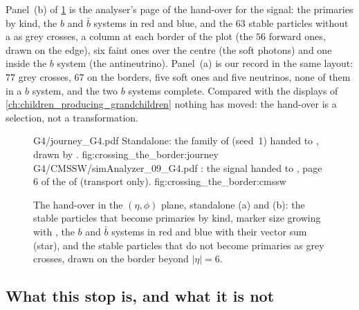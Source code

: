 Panel~(b) of \cref{fig:crossing_the_border:displays} is the analyser's page
of the hand-over for the signal: the primaries by kind, the $b$ and $\bar b$
systems in red and blue, and the $63$ stable particles without a
 as grey crosses, a column at each border of the plot (the
$56$ forward ones, drawn on the edge), six faint ones over the centre (the
soft photons) and one inside the $b$ system (the antineutrino). Panel~(a)
is our record in the same layout: $77$ grey crosses, $67$ on the borders,
five soft ones and five neutrinos, none of them in a $b$ system, and the two
$b$ systems complete. Compared with the displays of
\cref{ch:children_producing_grandchildren} nothing has moved: the hand-over is a selection,
not a transformation.

\begin{figure}[p]\centering
\ledgerdisplays
  {G4/journey_G4.pdf}
  {Standalone: the family of  (seed~1) handed to \GEANT, drawn by .}
  {fig:crossing_the_border:journey}
  {G4/CMSSW/simAnalyzer_09_G4.pdf}
  {\CMSSW: the signal handed to \GEANT, page 6 of the  of  (transport only).}
  {fig:crossing_the_border:cmssw}
\caption[The hand-over in the $(\eta,\phi)$ plane, standalone and
\CMSSW]{The hand-over in the $(\eta,\phi)$ plane, standalone (a) and \CMSSW
(b): the stable particles that become \GEANT primaries by kind, marker size
growing with \pt, the $b$ and $\bar b$ systems in red and blue with their
vector sum (star), and the stable particles that do not become primaries as
grey crosses, drawn on the border beyond $|\eta|=6$.}
\label{fig:crossing_the_border:displays}
\end{figure}

\subsection{What this stop is, and what it is not}
\label{sec:crossing_the_border:caveats}


